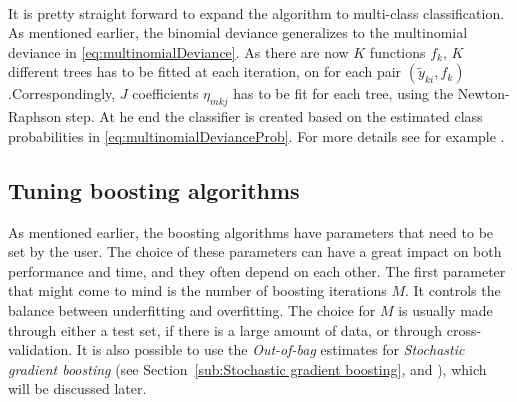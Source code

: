 \\
It is pretty straight forward to expand the algorithm to multi-class classification. As mentioned earlier, the binomial deviance generalizes to the multinomial deviance in \eqref{eq:multinomialDeviance}. As there are now $K$ functions $f_k$, $K$ different trees has to be fitted at each iteration, on for each pair $(\tilde y_{k i}, f_k)$.Correspondingly, $J$ coefficients $\eta_{m k j}$ has to be fit for each tree, using the Newton-Raphson step. At he end the classifier is created based on the estimated class probabilities in \eqref{eq:multinomialDevianceProb}. For more details see for example \cite{friedman}.

\subsection{Tuning boosting algorithms}
\label{sub:Tuning boosting algorithms}
As mentioned earlier, the boosting algorithms have parameters that need to be set by the user. The choice of these parameters can have a great impact on both performance and time, and they often depend on each other. The first parameter that might come to mind is the number of boosting iterations $M$. It controls the balance between underfitting and overfitting. The choice for $M$ is usually made through either a test set, if there is a large amount of data, or through cross-validation. It is also possible to use the \textit{Out-of-bag} estimates for  \textit{Stochastic gradient boosting} (see Section~\ref{sub:Stochastic gradient boosting}, and ), which will be discussed later. 

